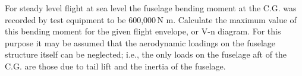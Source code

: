 \documentclass{AeroStructure-ERJohnson}
\begin{document}
\begin{enumerate}
{\def\thefigure{2.29}
}

For steady level flight at sea level the fuselage bending moment at the C.G. was recorded by test equipment to be 600,000\,N m. Calculate the maximum value of this bending moment for the given flight envelope, or V-n diagram. For this purpose it may be assumed that the aerodynamic loadings on the fuselage structure itself can be neglected; i.e., the only loads on the fuselage aft of the C.G. are those due to tail lift and the inertia of the fuselage.
\end{enumerate}

\clearemptydoublepage
\end{document}
